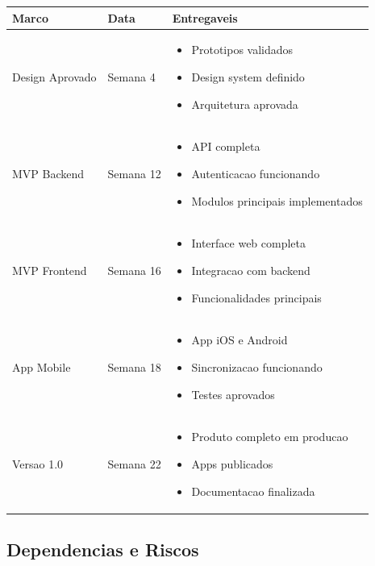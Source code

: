 \begin{longtable}{|p{3cm}|p{4cm}|p{6cm}|}
\hline
\textbf{Marco} & \textbf{Data} & \textbf{Entregaveis} \\
\hline
\endhead

Design Aprovado & Semana 4 & 
\begin{itemize}
    \item Prototipos validados
    \item Design system definido
    \item Arquitetura aprovada
\end{itemize} \\
\hline

MVP Backend & Semana 12 & 
\begin{itemize}
    \item API completa
    \item Autenticacao funcionando
    \item Modulos principais implementados
\end{itemize} \\
\hline

MVP Frontend & Semana 16 & 
\begin{itemize}
    \item Interface web completa
    \item Integracao com backend
    \item Funcionalidades principais
\end{itemize} \\
\hline

App Mobile & Semana 18 & 
\begin{itemize}
    \item App iOS e Android
    \item Sincronizacao funcionando
    \item Testes aprovados
\end{itemize} \\
\hline

Versao 1.0 & Semana 22 & 
\begin{itemize}
    \item Produto completo em producao
    \item Apps publicados
    \item Documentacao finalizada
\end{itemize} \\
\hline

\end{longtable}

\subsection{Dependencias e Riscos}

